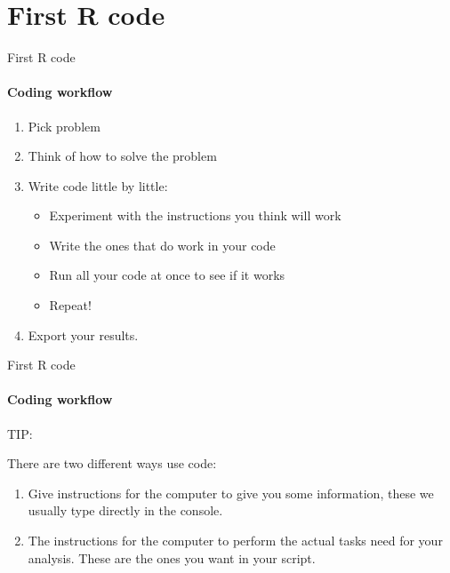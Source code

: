 \documentclass[ignorenonframetext,]{beamer}
\providecommand{\tightlist}{%
  \setlength{\itemsep}{0pt}\setlength{\parskip}{0pt}}
\begin{document}
\section{First R code}\label{first-r-code}

\begin{frame}{First R code}

\framesubtitle{Coding workflow}

\begin{enumerate}
\def\labelenumi{\arabic{enumi}.}
\tightlist
\item
  Pick problem
\item
  Think of how to solve the problem
\item
  Write code little by little:

  \begin{itemize}
  \tightlist
  \item
    Experiment with the instructions you think will work
  \item
    Write the ones that do work in your code
  \item
    Run all your code at once to see if it works\\
  \item
    Repeat!
  \end{itemize}
\item
  Export your results.
\end{enumerate}

\end{frame}

\begin{frame}{First R code}

\framesubtitle{Coding workflow}

\begin{block}{TIP:}

There are two different ways use code:

\begin{enumerate}
\def\labelenumi{\arabic{enumi}.}
\item
  Give instructions for the computer to give you some information, these
  we usually type directly in the console.
\item
  The instructions for the computer to perform the actual tasks need for
  your analysis. These are the ones you want in your script.
\end{enumerate}

\end{block}

\end{frame}
\end{document}
